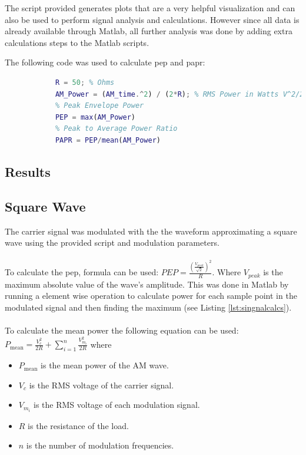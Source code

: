 \documentclass[a4paper]{article}
\begin{document}
        The script provided generates plots that are a very helpful visualization and can also be used to perform signal analysis and calculations. However since all data is already available through Matlab, all further analysis was done by adding extra calculations steps to the Matlab scripts.

        The following code was used to calculate \gls{pep} and \gls{papr}:

        \begin{lstlisting}[language=Matlab, caption={Signal processing calculations}, label={lst:singnalcalcs}]
            % AM Power
            R = 50; % Ohms
            AM_Power = (AM_time.^2) / (2*R); % RMS Power in Watts V^2/2R
            % Peak Envelope Power
            PEP = max(AM_Power)
            % Peak to Average Power Ratio
            PAPR = PEP/mean(AM_Power)
        \end{lstlisting}

        \subsection{Results}
        \subsection*{Square Wave}
            The carrier signal was modulated with the the waveform approximating a square wave using the provided script and modulation parameters.
            \\\\
            To calculate the \gls{pep}, formula can be used: $PEP = \frac{(\frac{V_{peak}}{\sqrt{2}})^2}{R}$. Where $V_{peak}$ is the maximum absolute value of the wave's amplitude. This was done in Matlab by running a element wise operation to calculate power for each sample point in the modulated signal and then finding the maximum (see Listing \ref{lst:singnalcalcs}).
            \\\\
            To calculate the mean power the following equation can be used: $P_{\text{mean}} = \frac{V_c^2}{2R} + \sum_{i=1}^{n} \frac{V_{m_i}^2}{2R}$ where

            \begin{itemize}
                \item \( P_{\text{mean}} \) is the mean power of the AM wave.
                \item \( V_c \) is the RMS voltage of the carrier signal.
                \item \( V_{m_i} \) is the RMS voltage of each modulation signal.
                \item \( R \) is the resistance of the load.
                \item \( n \) is the number of modulation frequencies.
            \end{itemize}
                
\end{document}
